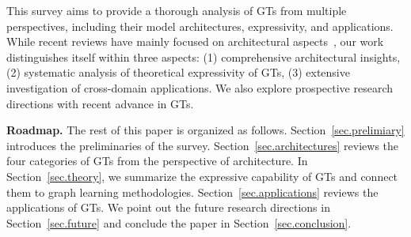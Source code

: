 This survey aims to provide a thorough analysis of GTs from multiple perspectives, including their model architectures, expressivity, and applications.  While recent reviews have mainly focused on architectural aspects~\cite{min2022transformer, muller2024attending}, our work distinguishes itself within three aspects: (1) comprehensive architectural insights, (2) systematic analysis of theoretical expressivity of GTs, (3) extensive investigation of cross-domain applications. We also explore prospective research directions with recent advance in GTs.


\textbf{Roadmap.} The rest of this paper is organized as follows. Section~\ref{sec.prelimiary} introduces the preliminaries of the survey. 
Section~\ref{sec.architectures} reviews the four categories of GTs from the perspective of architecture. 
In Section~\ref{sec.theory}, we summarize the expressive capability of GTs and connect them to graph learning methodologies. 
Section~\ref{sec.applications} reviews the applications of GTs. 
We point out the future research directions in Section~\ref{sec.future} and conclude the paper in Section~\ref{sec.conclusion}. 
